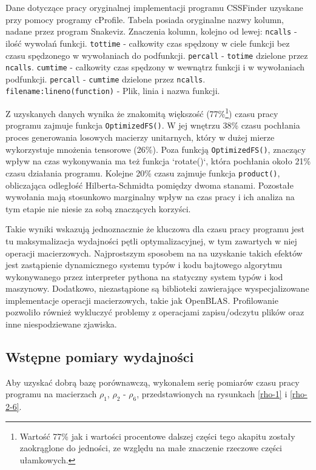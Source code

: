 \documentclass[11pt, a4paper]{article}
\newcommand{\code}[1]{\texttt{#1}}
\begin{document}
\begin{sloppypar}
    \FloatBarrier
    \begin{table}[ht]
      \tiny
      \centering
      
      \caption{Dane dotyczące pracy oryginalnej implementacji programu CSSFinder uzyskane przy pomocy programy cProfile. Tabela posiada oryginalne nazwy kolumn, nadane przez program Snakeviz. Znaczenia kolumn, kolejno od lewej: \code{ncalls} - ilość wywołań funkcji. \code{tottime} - całkowity czas spędzony w ciele funkcji bez czasu spędzonego w wywołaniach do podfunkcji. \code{percall} - \code{totime} dzielone przez \code{ncalls}. \code{cumtime} - całkowity czas spędzony w wewnątrz funkcji i w wywołaniach podfunkcji. \code{percall} - \code{cumtime} dzielone przez \code{ncalls}. \code{filename:lineno(function)} - Plik, linia i nazwa funkcji.}
    \end{table}
    \FloatBarrier

    Z uzyskanych danych wynika że znakomitą większość (77\%\footnote{Wartość 77\% jak i wartości
    procentowe dalszej części tego akapitu zostały zaokrąglone do jedności, ze względu
    na małe znaczenie rzeczowe części ułamkowych.}) czasu pracy programu zajmuje funkcja
    \code{OptimizedFS()}. W jej wnętrzu 38\% czasu pochłania proces generowania losowych
    macierzy unitarnych, który w dużej mierze wykorzystuje mnożenia tensorowe (26\%). Poza
    funkcją \code{OptimizedFS()}, znaczący wpływ na czas wykonywania ma też funkcja `rotate()`,
    która pochłania około 21\% czasu działania programu. Kolejne 20\% czasu zajmuje funkcja
    \code{product()}, obliczająca odległość Hilberta-Schmidta pomiędzy dwoma stanami.
    Pozostałe wywołania mają stosunkowo marginalny wpływ na czas pracy i ich analiza na
    tym etapie nie niesie za sobą znaczących korzyści.

    Takie wyniki wskazują jednoznacznie że kluczowa dla czasu pracy programu jest tu
    maksymalizacja wydajności pętli optymalizacyjnej, w tym zawartych w niej operacji macierzowych.
    Najprostszym sposobem na na uzyskanie takich efektów jest zastąpienie dynamicznego
    systemu typów i kodu bajtowego algorytmu wykonywanego przez interpreter pythona na
    statyczny system typów i kod maszynowy. Dodatkowo, niezastąpione są biblioteki
    zawierające wyspecjalizowane implementacje operacji macierzowych, takie jak OpenBLAS.
    Profilowanie pozwoliło również wykluczyć problemy z operacjami zapisu/odczytu plików
    oraz inne niespodziewane zjawiska.

    \subsection{Wstępne pomiary wydajności}
    Aby uzyskać dobrą bazę porównawczą, wykonałem serię pomiarów czasu pracy programu na
    macierzach $\rho_{1}$, $\rho_{2}$ - $\rho_{6}$, przedstawionych na rysunkach \ref{rho-1}
    i \ref{rho-2-6}.


\end{sloppypar}
\end{document}
